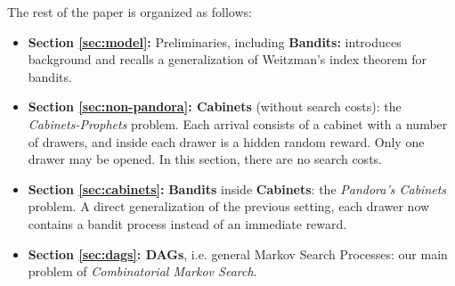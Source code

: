 The rest of the paper is organized as follows:
\begin{itemize}
  \item \textbf{Section \ref{sec:model}:} Preliminaries, including \textbf{Bandits:} introduces background and recalls a generalization of Weitzman's index theorem for bandits.
  \item \textbf{Section \ref{sec:non-pandora}: Cabinets} (without search costs): the \emph{Cabinets-Prophets} problem.
        Each arrival consists of a cabinet with a number of drawers, and inside each drawer is a hidden random reward.
        Only one drawer may be opened.
		In this section, there are no search costs.
  \item \textbf{Section \ref{sec:cabinets}:} \textbf{Bandits} inside \textbf{Cabinets}: the \emph{Pandora's Cabinets} problem.
        A direct generalization of the previous setting, each drawer now contains a bandit process instead of an immediate reward.
  \item \textbf{Section \ref{sec:dags}: DAGs}, i.e. general Markov Search Processes: our main problem of \emph{Combinatorial Markov Search}.
\end{itemize}

